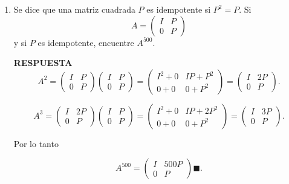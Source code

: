 \documentclass[11pt,letterpaper]{article}
\newcommand{\res}{\textbf{RESPUESTA}\\}
\newcommand{\finf}{\blacksquare.}
\begin{document}
\begin{enumerate}
\item Se dice que una matriz cuadrada $P$ es idempotente si $P^2=P$. Si 
\begin{equation*}
A=\left(\begin{array}{cc}
I& P\\
0&P
\end{array}
\right)
\end{equation*}
y si $P$ es idempotente, encuentre $A^{500}.$

\res
\begin{equation*}
A^2=\left(\begin{array}{cc}
I& P\\
0&P
\end{array}
\right)\left(\begin{array}{cc}
I& P\\
0&P
\end{array}
\right)=
\left(\begin{array}{cc}
I^2+0& IP+P^2\\
0+0&0+P^2
\end{array}
\right)=\left(\begin{array}{cc}
I&2P\\
0&P
\end{array}
\right).
\end{equation*}

\begin{equation*}
A^3=\left(\begin{array}{cc}
I& 2P\\
0&P
\end{array}
\right)\left(\begin{array}{cc}
I& P\\
0&P
\end{array}
\right)=
\left(\begin{array}{cc}
I^2+0& IP+2P^2\\
0+0&0+P^2
\end{array}
\right)=\left(\begin{array}{cc}
I&3P\\
0&P
\end{array}
\right).
\end{equation*}


Por lo tanto 

\begin{equation*}
A^{500}=\left(\begin{array}{cc}
I& 500P\\
0&P
\end{array}
\right) \finf
\end{equation*}


\end{enumerate}
\end{document}
